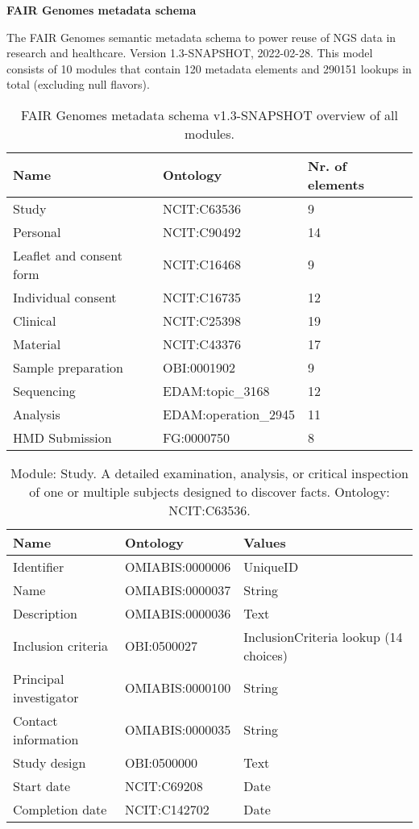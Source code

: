 \documentclass{article}
\begin{document}
\setlength\parindent{0pt}

\textbf{FAIR Genomes metadata schema}
\newline

The FAIR Genomes semantic metadata schema to power reuse of NGS data in research and healthcare. Version 1.3-SNAPSHOT, 2022-02-28. This model consists of 10 modules that contain 120 metadata elements and 290151 lookups in total (excluding null flavors).

\begin{table}[htb]
\begin{tabular}{lll}
Name & Ontology & Nr. of elements \\
\hline
Study & NCIT:C63536 & 9 \\
Personal & NCIT:C90492 & 14 \\
Leaflet and consent form & NCIT:C16468 & 9 \\
Individual consent & NCIT:C16735 & 12 \\
Clinical & NCIT:C25398 & 19 \\
Material & NCIT:C43376 & 17 \\
Sample preparation & OBI:0001902 & 9 \\
Sequencing & EDAM:topic\_3168 & 12 \\
Analysis & EDAM:operation\_2945 & 11 \\
HMD Submission & FG:0000750 & 8 \\
\hline
\end{tabular}
\caption[Module overview]{\label{table:table1} FAIR Genomes metadata schema v1.3-SNAPSHOT overview of all modules.}
\end{table}

\begin{table}[htb]
\begin{tabular}{lll}
Name & Ontology & Values \\
\hline
Identifier & OMIABIS:0000006 & UniqueID \\
Name & OMIABIS:0000037 & String \\
Description & OMIABIS:0000036 & Text \\
Inclusion criteria & OBI:0500027 & InclusionCriteria lookup (14 choices) \\
Principal investigator & OMIABIS:0000100 & String \\
Contact information & OMIABIS:0000035 & String \\
Study design & OBI:0500000 & Text \\
Start date & NCIT:C69208 & Date \\
Completion date & NCIT:C142702 & Date \\
\hline
\end{tabular}
\caption[Module: Study]{\label{table:table2} Module: Study. A detailed examination, analysis, or critical inspection of one or multiple subjects designed to discover facts. Ontology: NCIT:C63536. }
\end{table}
\end{document}

